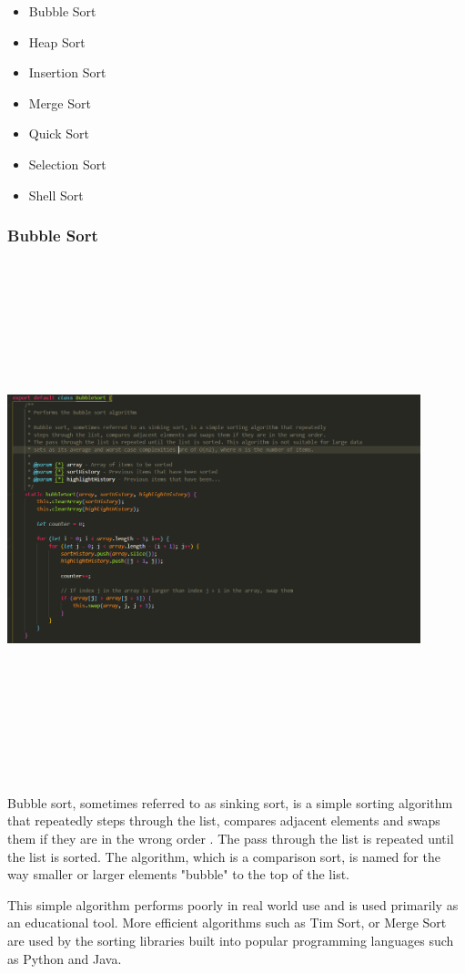 \begin{itemize}
    \item Bubble Sort \cite{bub_sor}
    \item Heap Sort
    \item Insertion Sort
    \item Merge Sort
    \item Quick Sort
    \item Selection Sort
    \item Shell Sort
\end{itemize}

\subsubsection{Bubble Sort}
\begin{center}
    \includegraphics[width=12cm,height=15cm,keepaspectratio]{images/bubblesort}
\end{center}
Bubble sort, sometimes referred to as sinking sort, is a simple sorting algorithm that repeatedly steps through the list, compares adjacent elements and swaps them if they are in the wrong order \cite{bubble_sort}. The pass through the list is repeated until the list is sorted. The algorithm, which is a comparison sort, is named for the way smaller or larger elements "bubble" to the top of the list.
\par
\bigskip
This simple algorithm performs poorly in real world use and is used primarily as an educational tool. More efficient algorithms such as Tim Sort, or Merge Sort are used by the sorting libraries built into popular programming languages such as Python and Java.

